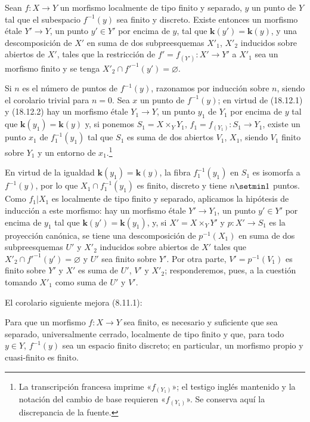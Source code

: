 \begin{corollary}[18.12.3]
\label{IV.18.12.3}
Sean $f:X\to Y$ un morfismo localmente de tipo finito y separado, $y$ un punto de $Y$ tal que el subespacio $f^{-1}(y)$ sea finito y discreto. Existe entonces un morfismo étale $Y'\to Y$, un punto $y'\in Y'$ por encima de $y$, tal que $\boldsymbol k(y')=\boldsymbol k(y)$, y una descomposición de $X'$ en suma de dos subpreesquemas $X'_1$, $X'_2$ inducidos sobre abiertos de $X'$, tales que la restricción de $f'=f_{(Y')}:X'\to Y'$ a $X'_1$ sea un morfismo finito y se tenga $X'_2\cap f'^{-1}(y')=\varnothing$.
\end{corollary}

Si $n$ es el número de puntos de $f^{-1}(y)$, razonamos por inducción sobre $n$, siendo el corolario trivial para $n=0$. Sea $x$ un punto de $f^{-1}(y)$; en virtud de (18.12.1) y (18.12.2) hay un morfismo étale $Y_1\to Y$, un punto $y_1$ de $Y_1$ por encima de $y$ tal que $\boldsymbol k(y_1)=\boldsymbol k(y)$ y, si ponemos $S_1=X\times_Y Y_1$, $f_1=f_{(Y_1)}:S_1\to Y_1$, existe un punto $x_1$ de $f_1^{-1}(y_1)$ tal que $S_1$ es suma de dos abiertos $V_1$, $X_1$, siendo $V_1$ finito sobre $Y_1$ y un entorno de $x_1$.\footnote{La transcripción francesa imprime «$f_{(Y_1)}$»; el testigo inglés mantenido y la notación del cambio de base requieren «$f_{(Y_1)}$». Se conserva aquí la discrepancia de la fuente.}


En virtud de la igualdad $\boldsymbol k(y_1)=\boldsymbol k(y)$, la fibra $f_1^{-1}(y_1)$ en $S_1$ es isomorfa a $f^{-1}(y)$, por lo que $X_1\cap f_1^{-1}(y_1)$ es finito, discreto y tiene $n\setmin 1$ puntos. Como $f_1|X_1$ es localmente de tipo finito y separado, aplicamos la hipótesis de inducción a este morfismo: hay un morfismo étale $Y'\to Y_1$, un punto $y'\in Y'$ por encima de $y_1$ tal que $\boldsymbol k(y')=\boldsymbol k(y_1)$, y, si $X'=X\times_Y Y'$ y $p:X'\to S_1$ es la proyección canónica, se tiene una descomposición de $p^{-1}(X_1)$ en suma de dos subpreesquemas $U'$ y $X'_2$ inducidos sobre abiertos de $X'$ tales que $X'_2\cap f'^{-1}(y')=\varnothing$ y $U'$ sea finito sobre $Y'$. Por otra parte, $V'=p^{-1}(V_1)$ es finito sobre $Y'$ y $X'$ es suma de $U'$, $V'$ y $X'_2$; responderemos, pues, a la cuestión tomando $X'_1$ como suma de $U'$ y $V'$.

El corolario siguiente mejora (8.11.1):

\begin{corollary}[18.12.4]
\label{IV.18.12.4}
Para que un morfismo $f:X\to Y$ sea finito, es necesario y suficiente que sea separado, universalmente cerrado, localmente de tipo finito y que, para todo $y\in Y$, $f^{-1}(y)$ sea un espacio finito discreto; en particular, un morfismo propio y cuasi-finito es finito.
\end{corollary}

